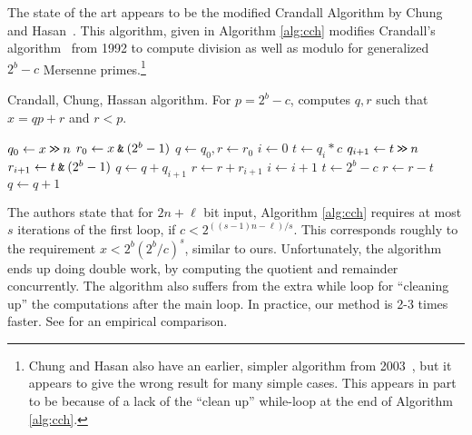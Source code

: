The state of the art appears to be the modified Crandall Algorithm by Chung and Hasan~\cite{chung2006low}.
This algorithm, given in Algorithm \ref{alg:cch} modifies Crandall's algorithm~\cite{crandall1992method} from 1992 to compute division as well as modulo for generalized $2^b-c$ Mersenne primes.\footnote{
	Chung and Hasan also have an earlier, simpler algorithm from 2003~\cite{chung2003more},
	but it appears to give the wrong result for many simple cases.
	This appears in part to be because of a lack of the ``clean up'' while-loop at the end of Algorithm \ref{alg:cch}.
}
\begin{algorithm}[H]
	\caption{Crandall, Chung, Hassan algorithm. For $p=2^b-c$, computes $q, r$ such that $x = qp+r$ and $r<p$.}
	\label{alg:cch}
	\begin{algorithmic}
		\State $q_0 \gets x \mathbin{\texttt{>\!>}} n$
		\State $r_0 \gets x \mathbin{\texttt{\&}} (2^b-1)$
		\State $q \gets q_0, r\gets r_0$
		\State $i \gets 0$
		\State $t \gets q_i*c$
		\State $q_{i+1} \gets t \mathbin{\texttt{>\!>}} n$
		\State $r_{i+1} \gets t \mathbin{\texttt{\&}} (2^b - 1)$
		\State $q\gets q+q_{i+1}$
		\State $r\gets r+r_{i+1}$
		\State $i\gets i+1$
		\EndWhile
		\State $t \gets 2^b-c$
		\State $r\gets r-t$
		\State $q\gets q+1$
		\EndWhile
	\end{algorithmic}
\end{algorithm}
The authors state that for $2n+\ell$ bit input, Algorithm \ref{alg:cch}
requires at most $s$ iterations of the first loop, if $c < 2^{((s-1)n-\ell)/s}$.
This corresponds roughly to the requirement $x < 2^b (2^b/c)^s$, similar to ours.
%
Unfortunately, the algorithm ends up doing double work, by computing the quotient and remainder concurrently.
The algorithm also suffers from the extra while loop for ``cleaning up'' the computations after the main loop.
In practice, our method is 2-3 times faster. See  for an empirical comparison.
%
